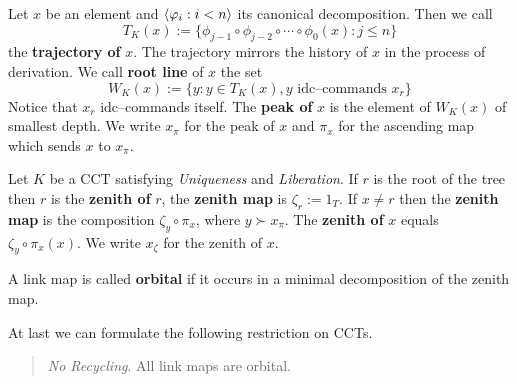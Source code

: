 Let $x$ be an element and $\langle \varphi_i : i < n\rangle$ its canonical
decomposition. Then we call
\begin{equation}
T_K(x) := \{\phi_{j-1} \circ \phi_{j-2}\circ\dotsb\circ\phi_0(x) :
    j \leq n\}
\end{equation}
the \textbf{trajectory of} $x$. The trajectory mirrors the history
of $x$ in the process of derivation. We call \textbf{root line}
of $x$ the set
\begin{equation}
W_K(x) := \{y : y \in T_K(x), y \text{ idc--commands }
    x_r\}
\end{equation}
Notice that $x_r$ idc--commands itself. The \textbf{peak of} $x$
is the element of $W_K(x)$ of smallest depth. We write $x_{\pi}$
for the peak of $x$ and $\pi_x$ for the ascending map which
sends $x$ to $x_{\pi}$.
\begin{defn}
Let $K$ be a CCT satisfying {\sl Uniqueness} and {\sl Liberation}.
If $r$ is the root of the tree then $r$ is the \textbf{zenith of} $r$,
the \textbf{zenith map} is $\zeta_r := 1_T$. If $x \neq r$ then
the \textbf{zenith map} is the composition $\zeta_y \circ \pi_x$,
where $y \succ x_{\pi}$. The \textbf{zenith of} $x$ equals $\zeta_y \circ %
\pi_x(x)$. We write $x_{\zeta}$ for the zenith of $x$.
\end{defn}
\begin{defn}
A link map is called \textbf{orbital} if it occurs in a minimal
decomposition of the zenith map.
\end{defn}
At last we can formulate the following restriction on CCTs.
\begin{quote}
{\sl No Recycling}. All link maps are orbital.
\end{quote}

